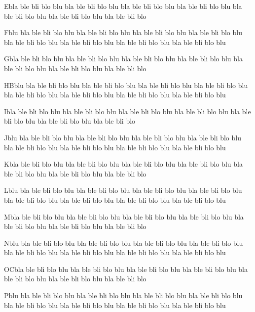 \documentclass[a4paper]{book}
\begin{document}
Ebla ble bli blo blu bla ble bli blo blu bla ble bli blo blu bla ble
bli blo blu bla ble bli blo blu bla ble bli blo blu bla ble bli blo

Fblu bla ble bli blo blu bla ble bli blo blu bla ble bli blo blu bla
ble bli blo blu bla ble bli blo blu bla ble bli blo blu bla ble bli
blo blu bla ble bli blo blu

Gbla ble bli blo blu bla ble bli blo blu bla ble bli blo blu bla ble
bli blo blu bla ble bli blo blu bla ble bli blo blu bla ble bli blo

HBblu bla ble bli blo blu bla ble bli blo blu bla ble bli blo blu bla
ble bli blo blu bla ble bli blo blu bla ble bli blo blu bla ble bli
blo blu bla ble bli blo blu

Ibla ble bli blo blu bla ble bli blo blu bla ble bli blo blu bla ble
bli blo blu bla ble bli blo blu bla ble bli blo blu bla ble bli blo

Jblu bla ble bli blo blu bla ble bli blo blu bla ble bli blo blu bla
ble bli blo blu bla ble bli blo blu bla ble bli blo blu bla ble bli
blo blu bla ble bli blo blu

Kbla ble bli blo blu bla ble bli blo blu bla ble bli blo blu bla ble
bli blo blu bla ble bli blo blu bla ble bli blo blu bla ble bli blo

Lblu bla ble bli blo blu bla ble bli blo blu bla ble bli blo blu bla
ble bli blo blu bla ble bli blo blu bla ble bli blo blu bla ble bli
blo blu bla ble bli blo blu

Mbla ble bli blo blu bla ble bli blo blu bla ble bli blo blu bla ble
bli blo blu bla ble bli blo blu bla ble bli blo blu bla ble bli blo

Nblu bla ble bli blo blu bla ble bli blo blu bla ble bli blo blu bla
ble bli blo blu bla ble bli blo blu bla ble bli blo blu bla ble bli
blo blu bla ble bli blo blu

OCbla ble bli blo blu bla ble bli blo blu bla ble bli blo blu bla ble
bli blo blu bla ble bli blo blu bla ble bli blo blu bla ble bli blo

Pblu bla ble bli blo blu bla ble bli blo blu bla ble bli blo blu bla
ble bli blo blu bla ble bli blo blu bla ble bli blo blu bla ble bli
blo blu bla ble bli blo blu
\end{document}
